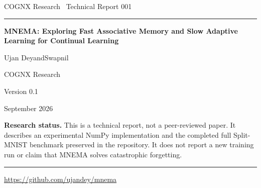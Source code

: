 \documentclass[10pt,a4paper]{article}
\begin{document}
\begin{titlepage}
\thispagestyle{empty}
{\large COGNX Research \textperiodcentered\ Technical Report 001\par}
\vspace{8mm}
\hrule height 0.5pt
\vspace{38mm}
{\LARGE\bfseries MNEMA: Exploring Fast Associative Memory and Slow Adaptive Learning for Continual Learning\par}
\vspace{18mm}
{\large Ujan Dey\quad and\quad Swapnil\par}
\vspace{4mm}
{\large COGNX Research\par}
\vspace{18mm}
Version 0.1\par
September 2026\par
\vfill
\begin{minipage}{0.92\textwidth}
\textbf{Research status.} This is a technical report, not a peer-reviewed paper.
It describes an experimental NumPy implementation and the completed full
Split-MNIST benchmark preserved in the repository. It does not report a new
training run or claim that MNEMA solves catastrophic forgetting.
\end{minipage}
\vspace{12mm}
\hrule height 0.3pt
\vspace{4mm}
\url{https://github.com/ujandey/mnema}
\end{titlepage}
\setcounter{page}{2}

\begin{abstract}
We investigate MNEMA, an experimental architecture combining fast associative
class memory, sparse representations, a slower adaptive spiking projection, and
internal consolidation. This report audits the current repository implementation
and describes its saved full Split-MNIST class-incremental benchmark: five
sequential digit-pair tasks, 60,000 training images, 10,000 test images, six
methods, and ten seeds. All ten classes remain available at inference, without
task-ID masking. Because native MNEMA inference changes adaptive state, the
benchmark restores the trained checkpoint after each test image. In the recorded
results, MNEMA achieves $77.12\pm0.87\%$ final task-macro accuracy and
$6.53\pm1.41$ percentage points of forgetting (mean $\pm$ sample standard
deviation). DER++-300 reaches higher final accuracy, $89.39\pm0.60\%$, whereas
MNEMA has the lowest observed mean forgetting among the six methods. These
metrics must be interpreted together. The nominal 64\,KiB FastStore setting is
not a total-model memory bound: recorded occupied payload is 73,388 bytes and
resident NumPy array payload is 4,391,100 bytes. Inference energy values are
partial operation-counter-based projections. The evidence supports investigation
of a retention--accuracy trade-off under this protocol; it does not establish
statistical significance, broad continual-learning capability, or measured
device efficiency.
\end{abstract}
\end{document}
